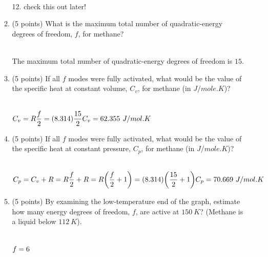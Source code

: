 \documentclass[fleqn]{article}
\begin{document}
\begin{enumerate}
\begin{enumerate}
        \textcolor{hwColor}{
          \\
          12. check this out later!
          \\
        }

      \item (5 points) What is the maximum total number of quadratic-energy degrees of freedom, $f$,
      for methane?

        \textcolor{hwColor}{
          \\
          The maximum total number of quadratic-energy degrees of freedom is $15$.
          \\
        }

      \item (5 points) If all $f$ modes were fully activated, what would be the value of the specific heat
      at constant volume, $C_v$, for methane (in $J/mole.K$)?

        \textcolor{hwColor}{
          \\
          $
            C_v=R \dfrac{f}{2}=(8.314) \dfrac{15}{2}
            \\
            \\
            \\
            C_v=62.355 ~ J/mol.K
          $
          \\
        }

      \item (5 points) If all $f$ modes were fully activated, what would be the value of the specific heat
      at constant pressure, $C_p$, for methane (in $J/mole.K$)?

        \textcolor{hwColor}{
          \\
          $
            C_p=C_v+R=R \dfrac{f}{2}+R=R \bigg( \dfrac{f}{2}+1 \bigg)=(8.314) \bigg( \dfrac{15}{2}+1 \bigg)
            \\
            \\
            \\
            C_p=70.669 ~ J/mol.K
            \\
          $
        }

      \item (5 points) By examining the low-temperature end of the graph, estimate how many energy
      degrees of freedom, $f$, are active at $150 ~ K$? (Methane is a liquid below $112 ~ K$).

        \textcolor{hwColor}{
          \\
          $
            f=6
            \\
          $
        \\
        }


\end{enumerate}
\end{enumerate}
\end{document}
